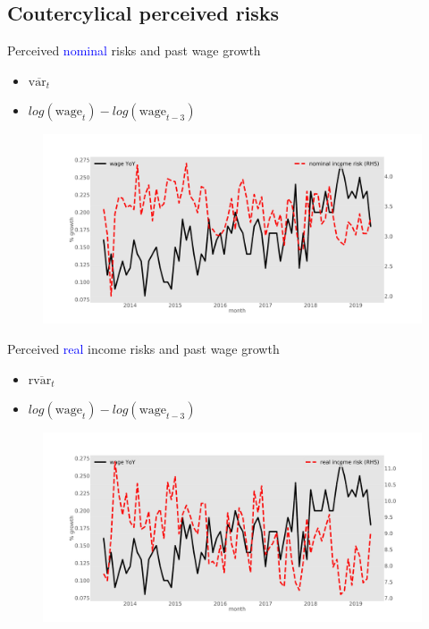 \documentclass{beamer}
\begin{document}
\subsection{Coutercylical perceived risks}


\begin{frame}{Perceived \textcolor{blue}{nominal} risks and past wage growth}
	\begin{itemize}
		\item $\overline{\text{var}_{t}} $
\item  $log(\text{wage}_t) - log(\text{wage}_{t-3})$
\end{itemize}
	\begin{figure}
		\centering
		\label{ts_var}
		\includegraphics[width=\textwidth]{figures/tsMeanvar_he.jpg}
	\end{figure}
\end{frame}


\begin{frame}{Perceived \textcolor{blue}{real} income risks and past wage growth}
	\begin{itemize}
	\item $\overline{\text{rvar}_{t}} $
	\item  $log(\text{wage}_t) - log(\text{wage}_{t-3})$
\end{itemize}
	\begin{figure}
		\centering 
		\label{ts_skew}
		\includegraphics[width=\textwidth]{figures/tsMeanrvar_he.jpg}
	\end{figure}
\end{frame}
\end{document}
